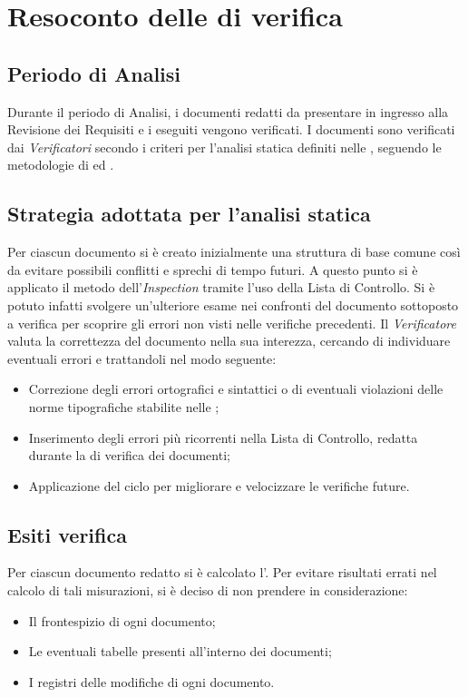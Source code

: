 \section{Resoconto delle  di verifica}
\label{resoconto}

\subsection{Periodo di Analisi}
Durante il periodo di Analisi, i documenti redatti da presentare in ingresso alla Revisione dei Requisiti e i  eseguiti vengono verificati. I documenti sono verificati dai \textit{Verificatori} secondo i criteri per l'analisi statica definiti nelle \textit{}, seguendo le metodologie di  ed .

\subsection{Strategia adottata per l'analisi statica}
Per ciascun documento si è creato inizialmente una struttura di base comune così da evitare possibili conflitti e sprechi di tempo futuri. A questo punto si è applicato il metodo dell’\textit{Inspection} tramite l'uso della Lista di Controllo. Si è potuto infatti svolgere un’ulteriore esame nei confronti del documento sottoposto a verifica per scoprire gli errori non visti nelle verifiche precedenti. Il \textit{Verificatore} valuta la correttezza del documento nella sua interezza, cercando di individuare eventuali errori e trattandoli nel modo seguente:
	\begin{itemize}
		\item Correzione degli errori ortografici e sintattici o di eventuali violazioni delle norme tipografiche stabilite nelle \textit{};
		\item Inserimento degli errori più ricorrenti nella Lista di Controllo, redatta durante la  di verifica dei documenti;
		\item Applicazione del ciclo  per migliorare e velocizzare le verifiche future.
	\end{itemize}
\subsection{Esiti verifica}
Per ciascun documento redatto si è calcolato l’. Per evitare risultati errati nel calcolo di tali misurazioni, si è deciso di non prendere in considerazione:
\begin{itemize}
	\item Il frontespizio di ogni documento;
	\item Le eventuali tabelle presenti all'interno dei documenti;
	\item I registri delle modifiche di ogni documento.
\end{itemize}